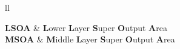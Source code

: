 \begin{abbreviations}{ll} %

\textbf{LSOA} & \textbf{L}ower \textbf{L}ayer \textbf{S}uper \textbf{O}utput \textbf{A}rea\\
\textbf{MSOA} & \textbf{M}iddle \textbf{L}ayer \textbf{S}uper \textbf{O}utput \textbf{A}rea\\

\end{abbreviations}
